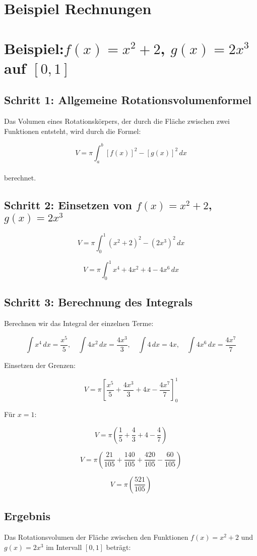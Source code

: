 \documentclass[a4paper,final]{report}
\begin{document}
\section{Beispiel Rechnungen}

\section{Beispiel:\( f(x) = x^2 + 2 \), \( g(x) = 2x^3 \) auf \( [0,1] \)}

\subsection{Schritt 1: Allgemeine Rotationsvolumenformel}
Das Volumen eines Rotationskörpers, der durch die Fläche zwischen zwei Funktionen entsteht, wird durch die Formel:

\[
V = \pi \int_a^b [f(x)]^2 - [g(x)]^2 \, dx
\]
\\
berechnet.
\\
\subsection{Schritt 2: Einsetzen von \( f(x) = x^2 + 2 \), \( g(x) = 2x^3 \)}
\[
V = \pi \int_0^1 (x^2 + 2)^2 - (2x^3)^2  \, dx
\]

\[
V = \pi \int_0^1 x^4 + 4x^2 + 4 - 4x^6 \, dx
\]

\subsection{Schritt 3: Berechnung des Integrals}
Berechnen wir das Integral der einzelnen Terme:

\[
\int x^4 \, dx = \frac{x^5}{5}, \quad \int 4x^2 \, dx = \frac{4x^3}{3}, \quad \int 4 \, dx = 4x, \quad \int 4x^6 \, dx = \frac{4x^7}{7}
\]

Einsetzen der Grenzen:

\[
V = \pi \left[ \frac{x^5}{5} + \frac{4x^3}{3} + 4x - \frac{4x^7}{7} \right]_0^1
\]

Für \( x = 1 \):

\[
V = \pi \left( \frac{1}{5} + \frac{4}{3} + 4 - \frac{4}{7} \right)
\]

\[
V = \pi \left( \frac{21}{105} + \frac{140}{105} + \frac{420}{105} - \frac{60}{105} \right)
\]

\[
V = \pi \left( \frac{521}{105} \right)
\]

\subsection{Ergebnis}
Das Rotationsvolumen der Fläche zwischen den Funktionen \( f(x) = x^2 + 2 \) und \( g(x) = 2x^3 \) im Intervall \( [0,1] \) beträgt:
\end{document}
